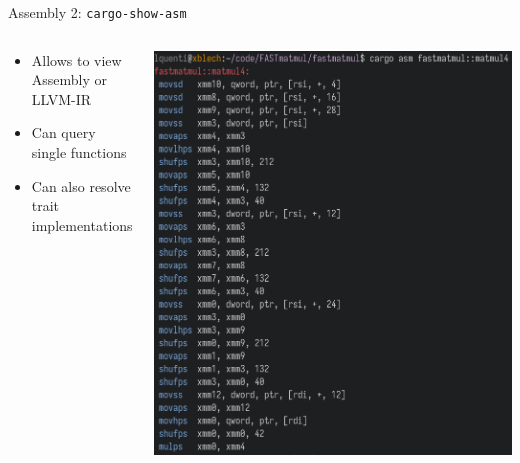 \documentclass[compress,aspectratio=169]{beamer}
\begin{document}
\begin{frame}{Assembly 2: \texttt{cargo-show-asm} \cite{cargo-asm}}
  \begin{columns}
    \begin{column}{0.5\textwidth}
      \begin{itemize}
        \item Allows to view Assembly or LLVM-IR
        \item Can query single functions
        \item Can also resolve trait implementations
      \end{itemize}
    \end{column}
    \begin{column}{0.5\textwidth}
    \includegraphics[height=.9\textheight]{./assets/cargoasm.png}
    \end{column}
  \end{columns}
\end{frame}
\end{document}
